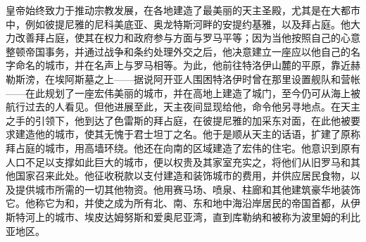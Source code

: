 皇帝始终致力于推动宗教发展，在各地建造了最美丽的天主圣殿，尤其是在大都市中，例如彼提尼雅的尼科美底亚、奥龙特斯河畔的安提约基雅，以及拜占庭。他大力改善拜占庭，使其在权力和政府参与方面与罗马平等；因为当他按照自己的心意整顿帝国事务，并通过战争和条约处理外交之后，他决意建立一座应以他自己的名字命名的城市，并在名声上与罗马相等。为此，他前往特洛伊山麓的平原，靠近赫勒斯滂，在埃阿斯墓之上——据说阿开亚人围困特洛伊时曾在那里设置舰队和营帐——在此规划了一座宏伟美丽的城市，并在高地上建造了城门，至今仍可从海上被航行过去的人看见。但他进展至此，天主夜间显现给他，命令他另寻地点。在天主之手的引领下，他到达了色雷斯的拜占庭，在彼提尼雅的加采东对面，在此他被要求建造他的城市，使其无愧于君士坦丁之名。他于是顺从天主的话语，扩建了原称拜占庭的城市，用高墙环绕。他还在向南的区域建造了宏伟的住宅。他意识到原有人口不足以支撑如此巨大的城市，便以权贵及其家室充实之，将他们从旧罗马和其他国家召来此处。他征收税款以支付建造和装饰城市的费用，并供应居民食物，以及提供城市所需的一切其他物资。他用赛马场、喷泉、柱廊和其他建筑豪华地装饰它。他称它为和，并使之成为所有北、南、东和地中海沿岸居民的帝国首都，从伊斯特河上的城市、埃皮达姆努斯和爱奥尼亚湾，直到库勒纳和被称为波里姆的利比亚地区。\par

